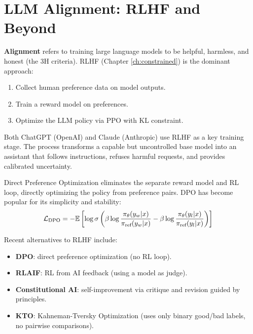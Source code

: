 \section{LLM Alignment: RLHF and Beyond}
\label{sec:app:llm}

\begin{definition}
\textbf{Alignment} refers to training large language models to be
helpful, harmless, and honest (the 3H criteria). RLHF (Chapter
\ref{ch:constrained}) is the dominant approach:
\begin{enumerate}
    \item Collect human preference data on model outputs.
    \item Train a reward model on preferences.
    \item Optimize the LLM policy via PPO with KL constraint.
\end{enumerate}
\end{definition}

\begin{example}
Both ChatGPT (OpenAI) and Claude (Anthropic) use RLHF as a key
training stage. The process transforms a capable but uncontrolled base
model into an assistant that follows instructions, refuses harmful
requests, and provides calibrated uncertainty.
\end{example}

\begin{definition}
Direct Preference Optimization eliminates the separate reward model
and RL loop, directly optimizing the policy from preference pairs. DPO
has become popular for its simplicity and stability:
\[
    \mathcal{L}_{\text{DPO}} = -\mathbb{E}\left[\log \sigma\left(
    \beta \log \frac{\pi_\theta(y_w|x)}{\pi_{\text{ref}}(y_w|x)}
    - \beta \log \frac{\pi_\theta(y_l|x)}{\pi_{\text{ref}}(y_l|x)}
    \right)\right]
\]
\end{definition}

\begin{remark}
Recent alternatives to RLHF include:
\begin{itemize}
    \item \textbf{DPO}: direct preference optimization (no RL loop).
    \item \textbf{RLAIF}: RL from AI feedback (using a model as judge).
    \item \textbf{Constitutional AI}: self-improvement via critique and
    revision guided by principles.
    \item \textbf{KTO}: Kahneman-Tversky Optimization (uses only
    binary good/bad labels, no pairwise comparisons).
\end{itemize}
\end{remark}

